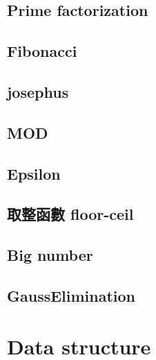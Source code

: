 \subsection{Prime factorization}


\subsection{Fibonacci}


\subsection{josephus}


\subsection{MOD}


\subsection{Epsilon}


\subsection{取整函數 floor-ceil}


\subsection{Big number}


\subsection{GaussElimination}


%





\section{Data structure}

